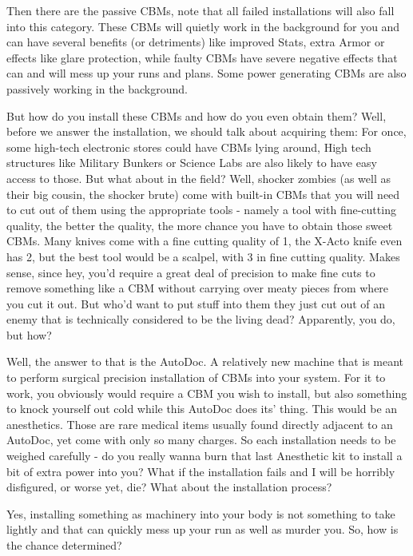 Then there are the passive CBMs, note that all failed installations will also fall into this category. These CBMs will quietly work in the background for you and can have several benefits (or detriments) like improved Stats, extra Armor or effects like glare protection, while faulty CBMs have severe negative effects that can and will mess up your runs and plans. Some power generating CBMs are also passively working in the background.

But how do you install these CBMs and how do you even obtain them? Well, before we answer the installation, we should talk about acquiring them: For once, some high-tech electronic stores could have CBMs lying around, High tech structures like Military Bunkers or Science Labs are also likely to have easy access to those. But what about in the field? Well, shocker zombies (as well as their big cousin, the shocker brute) come with built-in CBMs that you will need to cut out of them using the appropriate tools - namely a tool with fine-cutting quality, the better the quality, the more chance you have to obtain those sweet CBMs. Many knives come with a fine cutting quality of 1, the X-Acto knife even has 2, but the best tool would be a scalpel, with 3 in fine cutting quality. Makes sense, since hey, you'd require a great deal of precision to make fine cuts to remove something like a CBM without carrying over meaty pieces from where you cut it out. But who'd want to put stuff into them they just cut out of an enemy that is technically considered to be the living dead? Apparently, you do, but how?

Well, the answer to that is the AutoDoc. A relatively new machine that is meant to perform surgical precision installation of CBMs into your system. For it to work, you obviously would require a CBM you wish to install, but also something to knock yourself out cold while this AutoDoc does its' thing. This would be an anesthetics. Those are rare medical items usually found directly adjacent to an AutoDoc, yet come with only so many charges. So each installation needs to be weighed carefully - do you really wanna burn that last Anesthetic kit to install a bit of extra power into you? What if the installation fails and I will be horribly disfigured, or worse yet, die? What about the installation process?

Yes, installing something as machinery into your body is not something to take lightly and that can quickly mess up your run as well as murder you. So, how is the chance determined?

